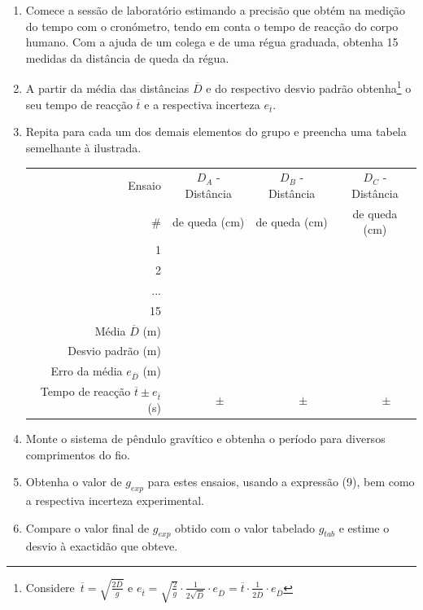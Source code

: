\documentclass[a4paper,twoside,12pt]{article}      %
\begin{document}
\begin{enumerate}
\item Comece a sessão de laboratório estimando a precisão que obtém na medição do tempo com o cronómetro, tendo em conta 
o tempo de reacção do corpo humano. 
Com a ajuda de um colega e de uma régua graduada, obtenha 15 medidas da distância de queda da régua. 
\item A partir da média das distâncias $\overline{D}$ e do respectivo desvio padrão obtenha\footnote{Considere $\,\overline{t}=\sqrt{\frac{2 \overline{D}}{g}}$ e   
$e_{\overline{t}}=\sqrt{\frac{2 }{g}} \cdot \frac{1}{2\sqrt{\overline{D}}} \cdot e_{\overline{D}}= \overline{t} \cdot \frac{1}{2\overline{D}} \cdot e_{\overline{D}} $ } o seu tempo de reacção $\overline{t}$ e a respectiva incerteza $e_{\overline{t}}$. 
\item Repita para cada um dos demais elementos do grupo e preencha uma tabela semelhante à ilustrada.
\begin{center}
\begin{tabular}{|r|c|c|c|}
\hline
Ensaio  & $D_A$ - Distância & $D_B$ - Distância & $D_C$ - Distância  \\
\# & de queda (cm) & de queda (cm) & de queda (cm)\\
\hline \hline
1 & & & \\
\hline
2 & &  &\\
\hline ... & & & \\
\hline 15 & & & \\
\hline \hline
Média $\overline{D}$ (m) & &  & \\
Desvio padrão (m) & & & \\
Erro da média  $e_{\overline{D}}$ (m) & & & \\ 
Tempo de reacção $\overline{t} \pm e_{\overline{t}}$ (s) & $\qquad \pm$  & $\qquad \pm$  & $\qquad \pm$  \\
\hline
\end{tabular}
\end{center}

\item Monte o sistema de pêndulo gravítico e obtenha o período para diversos comprimentos do fio. 
\item Obtenha o valor de $g_{exp}$ para estes ensaios, usando a expressão (9), bem como a respectiva incerteza experimental. 
\item Compare o valor final de $g_{exp}$ obtido com o valor tabelado $g_{tab}$ e estime o desvio à exactidão que obteve. 
\end{enumerate}
\end{document}
